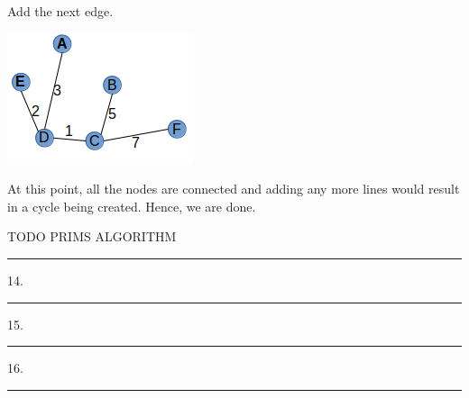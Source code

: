 \documentclass{article}
\begin{document}
Add the next edge. 

\includegraphics[scale=0.5]{./P13/kruskals/5}

At this point, all the nodes are connected and adding any more lines would result in a cycle being created. Hence, we are done. 


TODO PRIMS ALGORITHM





\noindent\rule{8cm}{0.4pt}

14. 

\noindent\rule{8cm}{0.4pt}


15.  

\noindent\rule{8cm}{0.4pt}

16. 


\noindent\rule{8cm}{0.4pt}
\end{document}
